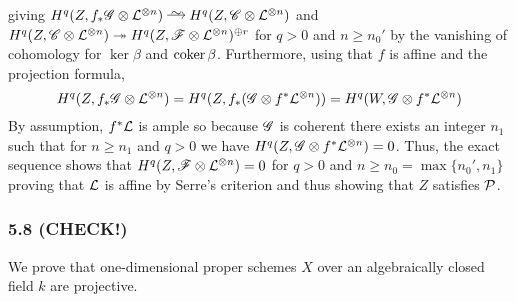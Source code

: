 \documentclass[12pt]{article}
\begin{document}
\begin{enumerate}
\begin{center}
\begin{tikzcd}[column sep = small]
\end{tikzcd}
\end{center}
giving $H^q(Z, f_* \G \otimes \L^{\otimes n}) \iso H^q(Z, \sC \otimes \L^{\otimes n})$ and $H^q(Z, \sC \otimes \L^{\otimes n}) \onto H^q(Z, \F \otimes \L^{\otimes n})^{\oplus r}$ for $q > 0$ and $n \ge n_0'$  by the vanishing of cohomology for $\ker{\beta}$ and $\coker{\beta}$. Furthermore, using that $f$ is affine and the projection formula,
\[ H^q(Z, f_* \G \otimes \L^{\otimes n}) = H^q(Z, f_* (\G \otimes f^* \L^{\otimes n})) = H^q(W, \G \otimes f^* \L^{\otimes n}) \]
By assumption, $f^* \L$ is ample so because $\G$ is coherent there exists an integer $n_1$ such that for $n \ge n_1$ and $q > 0$ we have $H^q(Z, \G \otimes f^* \L^{\otimes n}) = 0$. Thus, the exact sequence shows that $H^q(Z, \F \otimes \L^{\otimes n}) = 0$ for $q > 0$ and $n \ge n_0 = \max\{n_0', n_1\}$ proving that $\L$ is affine by Serre's criterion and thus showing that $Z$ satisfies $\cP$.
\end{enumerate}

\subsubsection{5.8 (CHECK!)}

We prove that one-dimensional proper schemes $X$ over an algebraically closed field $k$ are projective.
\end{document}
